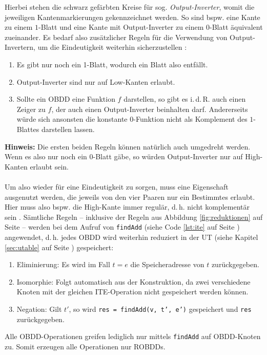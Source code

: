 \noindent
Hierbei stehen die schwarz gefärbten Kreise für sog. \textit{Output-Inverter}, womit die jeweiligen Kantenmarkierungen gekennzeichnet werden. So sind bspw. eine Kante zu einem $1$-Blatt und eine Kante mit Output-Inverter zu einem 0-Blatt äquivalent zueinander. Es bedarf also zusätzlicher Regeln für die Verwendung von Output-Invertern, um die Eindeutigkeit weiterhin sicherzustellen \cite[S.46-47]{s2007}:
\begin{enumerate}
	\item Es gibt nur noch ein 1-Blatt, wodurch ein Blatt also entfällt.
	\item Output-Inverter sind nur auf Low-Kanten erlaubt.
	\item Sollte ein OBDD eine Funktion $f$ darstellen, so gibt es i.\,d.\,R. auch einen Zeiger zu $f$, der auch einen Output-Inverter beinhalten darf. Andererseits würde sich ansonsten die konstante $0$-Funktion nicht als Komplement des $1$-Blattes darstellen lassen.
\end{enumerate}
\textbf{Hinweis:} Die ersten beiden Regeln können natürlich auch umgedreht werden. Wenn es also nur noch ein 0-Blatt gäbe, so würden Output-Inverter nur auf High-Kanten erlaubt sein.\\\\
Um also wieder für eine Eindeutigkeit zu sorgen, muss eine Eigenschaft ausgenutzt werden, die jeweils von den vier Paaren nur ein Bestimmtes erlaubt. Hier muss also bspw. die High-Kante immer regulär, d.\,h. nicht komplementär sein \cite[S.24-25]{s1997}. Sämtliche Regeln -- inklusive der Regeln aus Abbildung \ref{fig:reduktionen} auf Seite \pageref{fig:reduktionen} -- werden bei dem Aufruf von \texttt{findAdd} (siehe Code \ref{lst:ite} auf Seite \pageref{lst:ite}) angewendet, d.\,h. jedes OBDD wird weiterhin reduziert in der UT (siehe Kapitel \ref{sec:utable} auf Seite \pageref{sec:utable}) gespeichert:
\begin{enumerate}
	\item Eliminierung: Es wird im Fall $t=e$ die Speicheradresse von $t$ zurückgegeben.
	\item Isomorphie: Folgt automatisch aus der Konstruktion, da zwei verschiedene Knoten mit der gleichen ITE-Operation nicht gespeichert werden können.
	\item Negation: Gilt $t'$, so wird \texttt{res = findAdd(v, t', e')} gespeichert und \texttt{res} zurückgegeben.
\end{enumerate}
Alle OBDD-Operationen greifen lediglich nur mittels \texttt{findAdd} auf OBDD-Knoten zu. Somit erzeugen alle Operationen nur ROBDDs.\\
